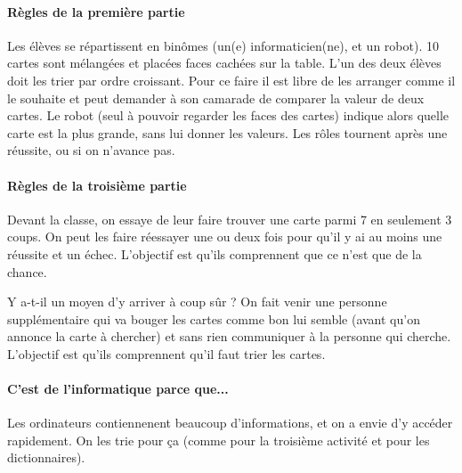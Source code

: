 \documentclass[a4paper,11pt]{article}%
\begin{document}
\paragraph{Règles de la première partie}
Les élèves se répartissent en binômes (un(e) informaticien(ne), et un robot). 10 cartes sont mélangées et placées faces cachées sur la table. L'un des deux élèves doit les trier par ordre croissant. Pour ce faire il est libre de les arranger comme il le souhaite et peut demander à son camarade de comparer la valeur de deux cartes. Le robot (seul à pouvoir regarder les faces des cartes) indique alors quelle carte est la plus grande, sans lui donner les valeurs. Les rôles tournent après une réussite, ou si on n'avance pas.


\paragraph{Règles de la troisième partie}


Devant la classe, on essaye de leur faire trouver une carte parmi 7 en seulement 3 coups. On peut les faire réessayer une ou deux fois pour qu'il y ai au moins une réussite et un échec. L'objectif est qu'ils comprennent que ce n'est que de la chance.

Y a-t-il un moyen d'y arriver à coup sûr ? On fait venir une personne supplémentaire qui va bouger les cartes comme bon lui semble (avant qu'on annonce la carte à chercher) et sans rien communiquer à la personne qui cherche. L'objectif est qu'ils comprennent qu'il faut trier les cartes.

  


\paragraph{C'est de l'informatique parce que...}
Les ordinateurs contiennenent beaucoup d'informations, et on a envie d'y accéder rapidement. On les trie pour ça (comme pour la troisième activité et pour les dictionnaires).
\end{document}
